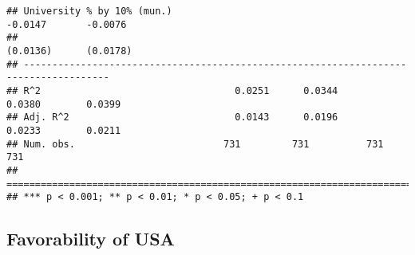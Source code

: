 \documentclass[
]{article}
\begin{document}
\begin{verbatim}
## University % by 10% (mun.)                                   -0.0147       -0.0076   
##                                                              (0.0136)      (0.0178)  
## -------------------------------------------------------------------------------------
## R^2                                  0.0251      0.0344       0.0380        0.0399   
## Adj. R^2                             0.0143      0.0196       0.0233        0.0211   
## Num. obs.                          731         731          731           731        
## =====================================================================================
## *** p < 0.001; ** p < 0.01; * p < 0.05; + p < 0.1
\end{verbatim}

\hypertarget{favorability-of-usa-1}{%
\subsection{Favorability of USA}\label{favorability-of-usa-1}}
\end{document}
